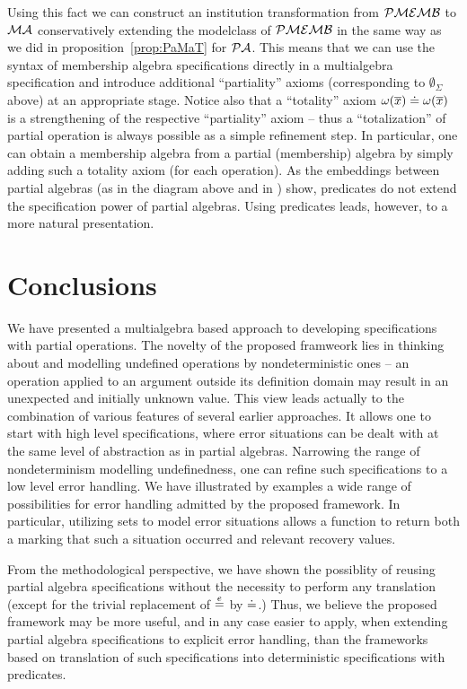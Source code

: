\documentclass[10pt]{article}
\begin{document}
%
Using this fact we can construct an institution transformation from
${\mathcal{PMEMB}}$ to ${\mathcal{MA}}$ conservatively extending the modelclass of
${\mathcal{PMEMB}}$ in the same way as we did in proposition~\ref{prop:PaMaT} for
${\mathcal{PA}}$. This means that we can use the syntax of membership algebra
specifications directly in a multialgebra specification and introduce
additional ``partiality'' axioms (corresponding to $\emptyset_\Sigma$ above)
at an appropriate stage. Notice also that a ``totality'' axiom
$\omega(\overline x)\mathrel{\dot{=} }\omega(\overline x)$ is a strengthening of the
respective ``partiality'' axiom -- thus a ``totalization'' of partial
operation is always possible as a simple refinement step. In particular, one
can obtain a membership algebra from a partial (membership) algebra  by
simply adding such a totality axiom (for each operation).
 As the embeddings
between partial algebras (as in the diagram above and in \cite{mossa}) show,
predicates do not extend the specification power of partial algebras. Using
predicates leads, however, to a more natural presentation.

\section{Conclusions}
We have presented a multialgebra based approach to developing specifications
with partial operations. The novelty of the proposed framweork lies in
thinking about and modelling undefined operations by nondeterministic ones --
an operation applied to an argument outside its definition domain may result
in an unexpected and initially unknown value. This view leads actually
to the combination of various features of several earlier approaches. It
allows one to start with high level specifications, where error
situations can be dealt with at the same level of abstraction as in partial
algebras. Narrowing the range of nondeterminism modelling undefinedness, one
can refine such specifications to a low level error handling. 
We have illustrated by examples a wide range of possibilities for error
handling admitted by the proposed framework. In particular, utilizing sets to
model error situations allows a function to return both a marking that such a
situation occurred and relevant recovery values.

From the methodological perspective, we have shown the possiblity of
reusing partial algebra specifications without the necessity to perform any
translation (except for the trivial replacement of $\stackrel{e}{=}$ by $\mathrel{\dot{=} }$.) Thus,
we believe the proposed framework may be more useful, and in any case easier
to apply, when extending partial algebra specifications to explicit error
handling, than the frameworks based on translation of such specifications into
deterministic specifications with predicates.
\end{document}
